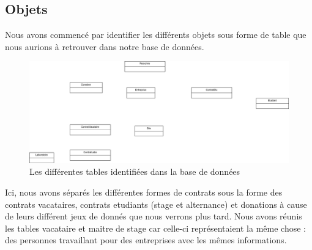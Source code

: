\documentclass[french,12pt,a4paper,titlepage]{report}
\begin{document}
		\subsection{Objets} Nous avons commencé par identifier les différents objets sous forme de table que nous aurions à retrouver dans notre base de données.
		\newline
		\begin{figure}[ht]
			\centering
			\includegraphics[width=1\linewidth]{rapports_assets/diag_db_table_only.png}
			\caption{Les différentes tables identifiées dans la base de données}
		\end{figure}
		\newline
		Ici, nous avons séparés les différentes formes de contrats sous la forme des contrats vacataires, contrats etudiants (stage et alternance) et donations à cause de leurs différent jeux de donnés que nous verrons plus tard.
		\newline
		Nous avons réunis les tables vacataire et maitre de stage car celle-ci représentaient la même chose : des personnes travaillant pour des entreprises avec les mêmes informations.
\end{document}

